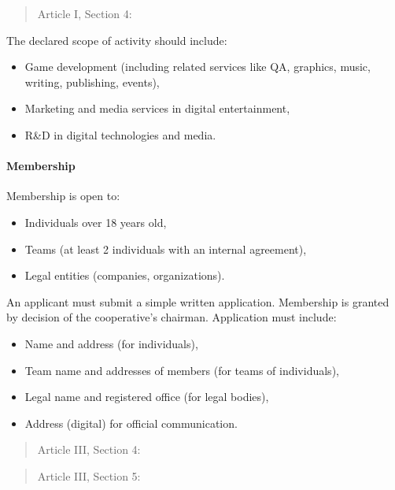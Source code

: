 \begin{quote}
    Article I, Section 4: 
\end{quote}

The declared scope of activity should include:
\begin{itemize}
    \item Game development (including related services like QA, graphics, music, writing, publishing, events),
    \item Marketing and media services in digital entertainment,
    \item R\&D in digital technologies and media.
\end{itemize}
\paragraph{Membership}
Membership is open to:
\begin{itemize}
    \item Individuals over 18 years old,
    \item Teams (at least 2 individuals with an internal agreement),
    \item Legal entities (companies, organizations).
\end{itemize}
An applicant must submit a simple written application. Membership is granted by decision of the cooperative’s chairman. Application must include:
\begin{itemize}
    \item Name and address (for individuals),
    \item Team name and addresses of members (for teams of individuals),
    \item Legal name and registered office (for legal bodies),
    \item Address (digital) for official communication.
\end{itemize}

\begin{quote}
    Article III, Section 4: 
\end{quote}

\begin{quote}
    Article III, Section 5: 
\end{quote}

